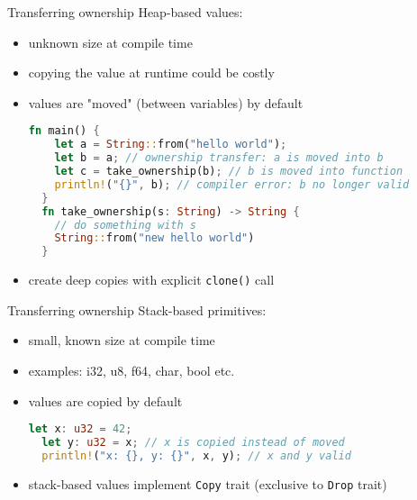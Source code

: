 \documentclass{beamer}
\begin{document}
\begin{frame}[fragile]{Transferring ownership}
Heap-based values: 
\begin{itemize}
  \item unknown size at compile time
  \item copying the value at runtime could be costly
  \item values are "moved" (between variables) by default

  \begin{lstlisting}[language=Rust]
  fn main() {
    let a = String::from("hello world");
    let b = a; // ownership transfer: a is moved into b
    let c = take_ownership(b); // b is moved into function
    println!("{}", b); // compiler error: b no longer valid
  }
  fn take_ownership(s: String) -> String {
    // do something with s
    String::from("new hello world")
  }
  \end{lstlisting}
  \item create deep copies with explicit \verb|clone()| call
\end{itemize}
\end{frame}


\begin{frame}[fragile]{Transferring ownership}
Stack-based primitives: 
\begin{itemize}
  \item small, known size at compile time
  \item examples: i32, u8, f64, char, bool etc.
  \item values are copied by default

  \begin{lstlisting}[language=Rust]
  let x: u32 = 42;
  let y: u32 = x; // x is copied instead of moved
  println!("x: {}, y: {}", x, y); // x and y valid
  \end{lstlisting}
  \item stack-based values implement \verb|Copy| trait (exclusive to \verb|Drop| trait)
\end{itemize}
\end{frame}
\end{document}
